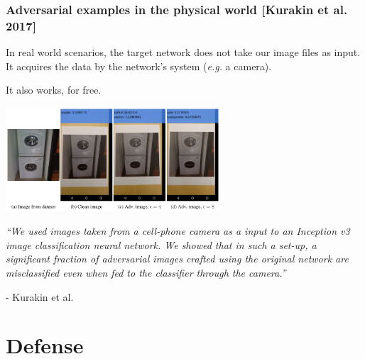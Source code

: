 \documentclass[9pt]{beamer}
\begin{document}
\begin{frame}
  \frametitle{Adversarial examples in the physical world [Kurakin et
      al. 2017]}

  In real world scenarios, the target network does not take our image
  files as input. It acquires the data by the network's system
  (\textit{e.g.} a camera).

  \medskip

  It also works, for free.

  \begin{center}
    \includegraphics[width = 8cm]{images/physical_adversarial_sample.png}
  \end{center}


  \textit{``We used images taken from a cell-phone camera as a input
    to an Inception v3 image classification neural network. We showed
    that in such a set-up, a significant fraction of adversarial
    images crafted using the original network are misclassified even
    when fed to the classifier through the camera.''}

  \smallskip

  - Kurakin et al.

\end{frame}

\section{Defense}


\end{document}
